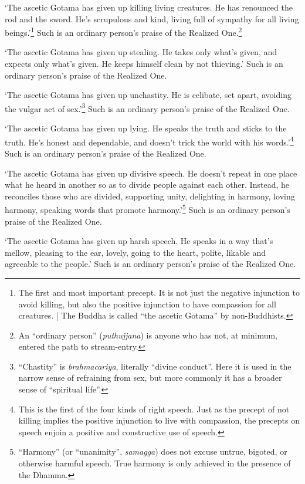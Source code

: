 \documentclass[12pt,openany]{book}%
\begin{document}
‘The ascetic Gotama has given up killing living creatures. He has renounced the rod and the sword. He’s scrupulous and kind, living full of sympathy for all living beings.’\footnote{The first and most important precept. It is not just the negative injunction to avoid killing, but also the positive injunction to have compassion for all creatures. | The Buddha is called “the ascetic Gotama” by non-Buddhists. } Such is an ordinary person’s praise of the Realized One.\footnote{An “ordinary person” (\textit{puthujjana}) is anyone who has not, at minimum, entered the path to stream-entry. } 

‘The ascetic Gotama has given up stealing. He takes only what’s given, and expects only what’s given. He keeps himself clean by not thieving.’ Such is an ordinary person’s praise of the Realized One. 

‘The ascetic Gotama has given up unchastity. He is celibate, set apart, avoiding the vulgar act of sex.’\footnote{“Chastity” is \textit{brahmacariya}, literally “divine conduct”. Here it is used in the narrow sense of refraining from sex, but more commonly it has a broader sense of “spiritual life”. } Such is an ordinary person’s praise of the Realized One. 

‘The ascetic Gotama has given up lying. He speaks the truth and sticks to the truth. He’s honest and dependable, and doesn’t trick the world with his words.’\footnote{This is the first of the four kinds of right speech. Just as the precept of not killing implies the positive injunction to live with compassion, the precepts on speech enjoin a positive and constructive use of speech. } Such is an ordinary person’s praise of the Realized One. 

‘The ascetic Gotama has given up divisive speech. He doesn’t repeat in one place what he heard in another so as to divide people against each other. Instead, he reconciles those who are divided, supporting unity, delighting in harmony, loving harmony, speaking words that promote harmony.’\footnote{“Harmony” (or “unanimity”, \textit{samagga}) does not excuse untrue, bigoted, or otherwise harmful speech. True harmony is only achieved in the presence of the Dhamma. } Such is an ordinary person’s praise of the Realized One. 

‘The ascetic Gotama has given up harsh speech. He speaks in a way that’s mellow, pleasing to the ear, lovely, going to the heart, polite, likable and agreeable to the people.’ Such is an ordinary person’s praise of the Realized One. 
\end{document}
